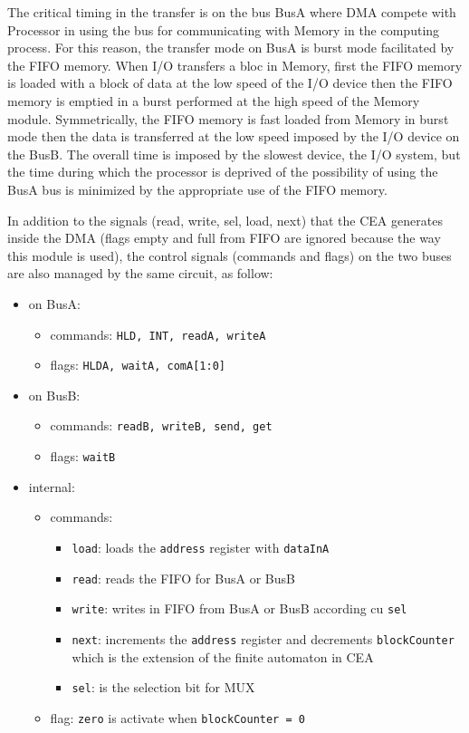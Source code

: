 The critical timing in the transfer is on the bus BusA where DMA compete with Processor in using the bus for communicating with Memory in the computing process. For this reason, the transfer mode on BusA is burst mode facilitated by the  FIFO memory. When I/O transfers a bloc in Memory, first the FIFO memory is loaded with a block of data at the low speed of the I/O device then the FIFO memory is emptied in a burst performed at the high speed of the Memory module. Symmetrically, the FIFO memory is fast loaded from Memory in burst mode then the data is transferred  at the low speed imposed by the I/O device on the BusB. The overall time is imposed by the slowest device, the I/O system, but the time during which the processor is deprived of the possibility of using the BusA bus is minimized by the appropriate use of the FIFO memory.

In addition to the signals (read, write, sel, load, next) that the CEA generates inside the DMA (flags empty and full from FIFO are ignored because the way this module is used), the control signals (commands and flags) on the two buses are also managed by the same circuit, as follow:
\begin{itemize}
    \item on BusA:
        \begin{itemize}
            \item commands: {\tt HLD, INT, readA, writeA}
            \item flags: {\tt HLDA, waitA, comA[1:0]}
        \end{itemize}
    \item on BusB:
        \begin{itemize}
            \item commands: {\tt readB, writeB, send, get}
            \item flags: {\tt waitB}
        \end{itemize}
    \item internal:
        \begin{itemize}
            \item commands:
                \begin{itemize}
                    \item {\tt load}: loads the {\tt address} register with {\tt dataInA}
                    \item {\tt read}: reads the FIFO for BusA or BusB
                    \item {\tt write}: writes in FIFO from BusA or BusB according cu {\tt sel}
                    \item {\tt next}: increments the {\tt address} register and decrements {\tt blockCounter} which is the extension of the finite automaton in CEA
                    \item {\tt sel}: is the selection bit for MUX
                \end{itemize}
            \item flag: {\tt zero} is activate when {\tt blockCounter = 0}
        \end{itemize}
    
\end{itemize}

